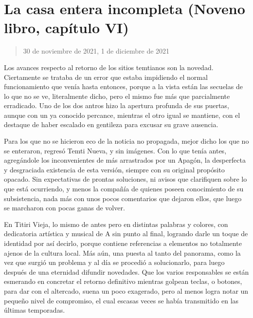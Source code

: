 \documentclass[
]{book}
\begin{document}
\hypertarget{la-casa-entera-incompleta-noveno-libro-capuxedtulo-vi}{%
\section{La casa entera incompleta (Noveno libro, capítulo VI)}\label{la-casa-entera-incompleta-noveno-libro-capuxedtulo-vi}}

\begin{quote}
30 de noviembre de 2021, 1 de diciembre de 2021
\end{quote}

Los avances respecto al retorno de los sitios temtianos son la novedad. Ciertamente se trataba de un error que estaba impidiendo el normal funcionamiento que venía hasta entonces, porque a la vista están las secuelas de lo que no se ve, literalmente dicho, pero el mismo fue más que parcialmente erradicado. Uno de los dos antros hizo la apertura profunda de sus puertas, aunque con un ya conocido percance, mientras el otro igual se mantiene, con el destaque de haber escalado en gentileza para excusar su grave ausencia.

Para los que no se hicieron eco de la noticia no propagada, mejor dicho los que no se enteraron, regresó Temti Nueva, y sin imágenes. Con lo que tenía antes, agregándole los inconvenientes de más arrastrados por un Apagón, la desperfecta y desgraciada existencia de esta versión, siempre con su original propósito opacado. Sin expectativas de prontas soluciones, ni avisos que clarifiquen sobre lo que está ocurriendo, y menos la compañía de quienes poseen conocimiento de su subsistencia, nada más con unos pocos comentarios que dejaron ellos, que luego se marcharon con pocas ganas de volver.

En Titiri Vieja, lo mismo de antes pero en distintas palabras y colores, con dedicatoria artística y musical de A sin punto al final, logrando darle un toque de identidad por así decirlo, porque contiene referencias a elementos no totalmente ajenos de la cultura local. Más aún, una puesta al tanto del panorama, como la vez que surgió un problema y al día se procedió a solucionarlo, para luego después de una eternidad difundir novedades. Que los varios responsables se están esmerando en concretar el retorno definitivo mientras golpean teclas, o botones, para dar con el altercado, suena un poco exagerado, pero al menos logra notar un pequeño nivel de compromiso, el cual escasas veces se había transmitido en las últimas temporadas.
\end{document}
